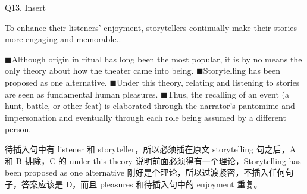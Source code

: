 \begin{blk}
  \begin{qst}
    Q13. Insert
  \end{qst}

  \begin{chc}
    To enhance their listeners’ enjoyment, storytellers continually make their stories more engaging and memorable..
  \end{chc}

  \begin{psgq}
    $\blacksquare$Although origin in ritual has long been the most popular, it is by no means the only theory about how the theater came into being. $\blacksquare$Storytelling has been proposed as one alternative. $\blacksquare$Under this theory, relating and listening to stories are seen as fundamental human pleasures. $\blacksquare$Thus, the recalling of an event (a hunt, battle, or other feat) is elaborated through the narrator’s pantomime and impersonation and eventually through each role being assumed by a different person.
  \end{psgq}

  \begin{nlz}
    待插入句中有 listener 和 storyteller，所以必须插在原文 storytelling 句之后，A 和 B 排除，C 的 under this theory 说明前面必须得有一个理论，Storytelling has been proposed as one alternative 刚好是个理论，所以过渡紧密，不插入任何句子，答案应该是 D，而且 pleasures 和待插入句中的 enjoyment 重复。
  \end{nlz}
\end{blk}

